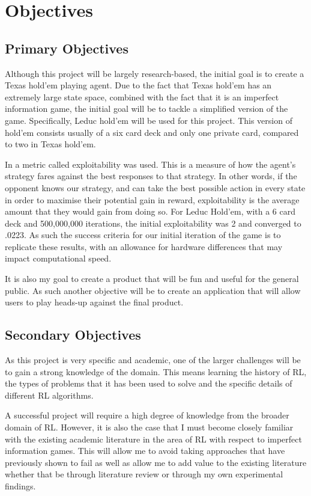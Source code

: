 \section{Objectives}\label{sec:objectives}
\subsection{Primary Objectives}\label{subsec:primaryObjectives}

Although this project will be largely research-based, the initial goal is to create a Texas hold'em
playing agent.
Due to the fact that Texas hold'em has an extremely large state space, combined with the fact that it
is an imperfect information game, the initial goal will be to tackle a simplified version of the game.
Specifically, Leduc hold'em will be used for this project.
This version of hold'em consists usually of a six card deck and only one private card, compared to two in Texas hold'em.

In\citep{heinrich2015smooth} a metric called exploitability was used.
This is a measure of how the agent's strategy fares against the best responses to that strategy.
In other words, if the opponent knows our strategy, and can take the best possible action
in every state in order to maximise their potential gain in reward, exploitability is the average amount
that they would gain from doing so.
For Leduc Hold'em, with a 6 card deck and 500,000,000 iterations, the initial exploitability was 2 and converged
to .0223.
As such the success criteria for our initial iteration of the game is to replicate these results, with an
allowance for hardware differences that may impact computational speed.

It is also my goal to create a product that will be fun and useful for the general public.
As such another objective will be to create an application that will allow users to play heads-up
against the final product.

\subsection{Secondary Objectives}\label{subsec:secondaryObjectives}
As this project is very specific and academic, one of the larger challenges will be to gain a strong knowledge
of the domain.
This means learning the history of RL, the types of problems that it has been used to solve and the specific details of
different RL algorithms.

A successful project will require a high degree of knowledge from the broader domain of RL. However, it is also the case
that I must become closely familiar with the existing academic literature in the area of RL with respect to imperfect
information games.
This will allow me to avoid taking approaches that have previously shown to fail as well as allow me to add value to
the existing literature whether that be through literature review or through my own experimental findings.


